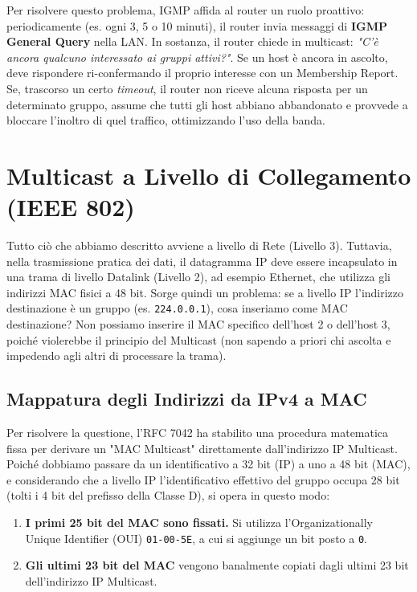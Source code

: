 Per risolvere questo problema, IGMP affida al router un ruolo proattivo: periodicamente (es. ogni 3, 5 o 10 minuti), il router invia messaggi di \textbf{IGMP General Query} nella LAN. In sostanza, il router chiede in multicast: \textit{"C'è ancora qualcuno interessato ai gruppi attivi?"}.
Se un host è ancora in ascolto, deve rispondere ri-confermando il proprio interesse con un Membership Report. Se, trascorso un certo \textit{timeout}, il router non riceve alcuna risposta per un determinato gruppo, assume che tutti gli host abbiano abbandonato e provvede a bloccare l'inoltro di quel traffico, ottimizzando l'uso della banda.

\section{Multicast a Livello di Collegamento (IEEE 802)}

Tutto ciò che abbiamo descritto avviene a livello di Rete (Livello 3). Tuttavia, nella trasmissione pratica dei dati, il datagramma IP deve essere incapsulato in una trama di livello Datalink (Livello 2), ad esempio Ethernet, che utilizza gli indirizzi MAC fisici a 48 bit. 
Sorge quindi un problema: se a livello IP l'indirizzo destinazione è un gruppo (es. \texttt{224.0.0.1}), cosa inseriamo come MAC destinazione? Non possiamo inserire il MAC specifico dell'host 2 o dell'host 3, poiché violerebbe il principio del Multicast (non sapendo a priori chi ascolta e impedendo agli altri di processare la trama).

\subsection{Mappatura degli Indirizzi da IPv4 a MAC}
Per risolvere la questione, l'RFC 7042 ha stabilito una procedura matematica fissa per derivare un "MAC Multicast" direttamente dall'indirizzo IP Multicast. Poiché dobbiamo passare da un identificativo a 32 bit (IP) a uno a 48 bit (MAC), e considerando che a livello IP l'identificativo effettivo del gruppo occupa 28 bit (tolti i 4 bit del prefisso della Classe D), si opera in questo modo:

\begin{enumerate}
    \item \textbf{I primi 25 bit del MAC sono fissati.} Si utilizza l'Organizationally Unique Identifier (OUI) \texttt{01-00-5E}, a cui si aggiunge un bit posto a \texttt{0}. 
    \item \textbf{Gli ultimi 23 bit del MAC} vengono banalmente copiati dagli ultimi 23 bit dell'indirizzo IP Multicast.
\end{enumerate}

